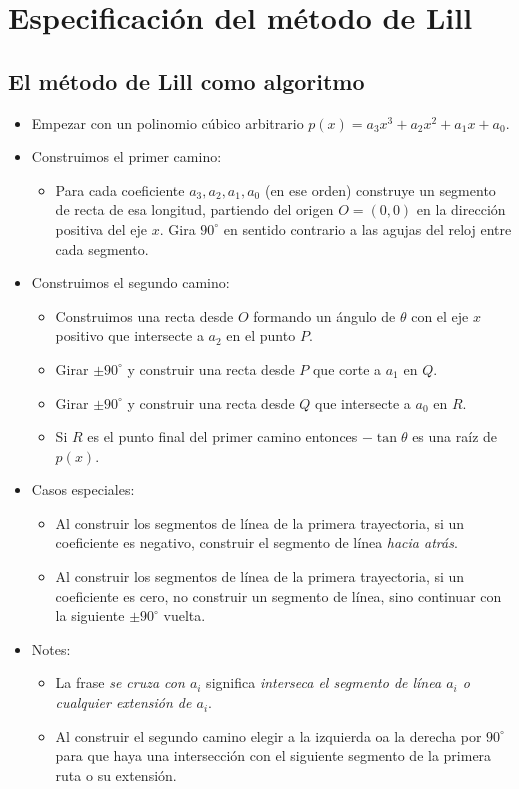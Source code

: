 \section{Especificación del método de Lill}\label{s.method}

\subsection{El método de Lill como algoritmo}
\begin{itemize}
\item Empezar con un polinomio cúbico arbitrario $p(x)=a_3x^3+a_2x^2+a_1x+a_0$.
\item Construimos el primer camino:
\begin{itemize}
\item Para cada coeficiente $a_3,a_2,a_1,a_0$ (en ese orden) construye un segmento de recta de esa longitud, partiendo del origen $O=(0,0)$ en la dirección positiva del eje $x$. Gira $90^\circ$ en sentido contrario a las agujas del reloj entre cada segmento.
\end{itemize}
\item Construimos el segundo camino:
\begin{itemize}
\item Construimos una recta desde $O$ formando un ángulo de $\theta$ con el eje $x$ positivo que intersecte a $a_2$ en el punto $P$.
\item Girar $\pm 90^\circ$ y construir una recta desde $P$ que corte a $a_1$ en $Q$.
\item Girar $\pm 90^\circ$ y construir una recta desde $Q$ que intersecte a $a_0$ en $R$.
\item Si $R$ es el punto final del primer camino entonces $-\tan\theta$ es una raíz de $p(x)$.
\end{itemize}
\item Casos especiales:
\begin{itemize}
\item Al construir los segmentos de línea de la primera trayectoria, si un coeficiente es negativo, construir el segmento de línea \emph{hacia atrás}.
\item Al construir los segmentos de línea de la primera trayectoria, si un coeficiente es cero, no construir un segmento de línea, sino continuar con la siguiente $\pm 90^\circ$ vuelta.
\end{itemize}
\item Notes:
\begin{itemize}
\item La frase \emph{se cruza con $a_i$} significa \emph{interseca el segmento de línea $a_i$ o cualquier extensión de $a_i$}.
\item Al construir el segundo camino elegir a la izquierda oa la derecha por $90^\circ$ para que haya una intersección con el siguiente segmento de la primera ruta o su extensión.
\end{itemize}
\end{itemize}

